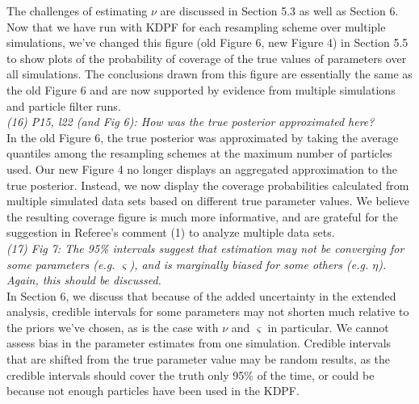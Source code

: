 \documentclass{article}
\newcommand{\danny}[1]{{\color{blue} DANNY: #1}}
\begin{document}
The challenges of estimating $\nu$ are discussed in Section 5.3 as well as Section 6. Now that we have run with KDPF for each resampling scheme over multiple simulations, we've changed this figure (old Figure 6, new Figure 4) in Section 5.5 to show plots of the probability of coverage of the true values of parameters over all simulations. The conclusions drawn from this figure are essentially the same as the old Figure 6 and are now supported by evidence from multiple simulations and particle filter runs. \\

\noindent \emph{(16) P15, l22 (and Fig 6): How was the true posterior approximated here?} \\

In the old Figure 6, the true posterior was approximated by taking the average quantiles among the resampling schemes at the maximum number of particles used. Our new Figure 4 no longer displays an aggregated approximation to the true posterior. Instead, we now display the coverage probabilities calculated from multiple simulated data sets based on different true parameter values. We believe the resulting coverage figure is much more informative, and are grateful for the suggestion in Referee's comment (1) to analyze multiple data sets. \\


\noindent \emph{(17) Fig 7: The 95\% intervals suggest that estimation may not be converging for some parameters (e.g. $\varsigma$), and is marginally biased for some others (e.g. $\eta$). Again, this should be discussed.} \\

In Section 6, we discuss that because of the added uncertainty in the extended analysis, credible intervals for some parameters may not shorten much relative to the priors we've chosen, as is the case with $\nu$ and $\varsigma$ in particular. We cannot assess bias in the parameter estimates from one simulation. Credible intervals that are shifted from the true parameter value may be random results, as the credible intervals should cover the truth only 95\% of the time, or could be because not enough particles have been used in the KDPF. \\

\end{document}
